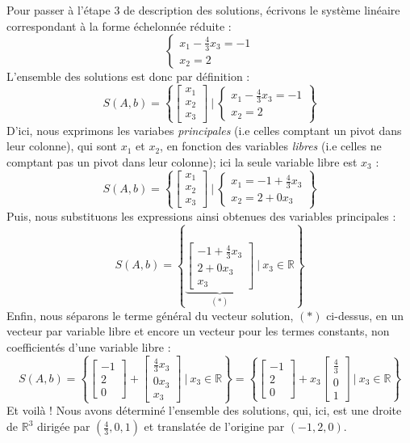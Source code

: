 \documentclass{article}
\newcommand{\R}{\mathbb{R}}
\begin{document}
Pour passer à l'étape 3 de description des solutions, écrivons le système linéaire correspondant à la forme échelonnée réduite :
$$
\begin{cases}
x_1 -\frac{4}{3}x_3 = -1\\
x_2 = 2
\end{cases}
$$
L'ensemble des solutions est donc par définition :
$$
S(A,b) = \left\{ \begin{bmatrix}
x_1 \\ x_2 \\ x_3
\end{bmatrix} \ | \ \begin{cases}
x_1 -\frac{4}{3}x_3 = -1\\
x_2 = 2
\end{cases}\right\}
$$
D'ici, nous exprimons les variabes \textit{principales} (i.e celles comptant un pivot dans leur colonne), qui sont $x_1$ et $x_2$, en fonction des variables \textit{libres} (i.e celles ne comptant pas un pivot dans leur colonne); ici la seule variable libre est $x_3$ :
$$
S(A,b) = \left\{ \begin{bmatrix}
x_1 \\ x_2 \\ x_3
\end{bmatrix} \ | \ \begin{cases}
x_1 = -1 +\frac{4}{3}x_3\\
x_2 = 2 + 0x_3
\end{cases}\right\}
$$
Puis, nous substituons les expressions ainsi obtenues des variables principales :
$$
S(A,b) = \left\{ \underbrace{\begin{bmatrix}
-1 +\frac{4}{3}x_3 \\ 2 + 0x_3 \\ x_3
\end{bmatrix}}_{(*)} \ | \ x_3 \in \R\right\}
$$
Enfin, nous séparons le terme général du vecteur solution, $(*)$ ci-dessus, en un vecteur par variable libre et encore un vecteur pour les termes constants, non coefficientés d'une variable libre :
$$
S(A,b) = \left\{ \begin{bmatrix}
-1 \\ 2 \\0
\end{bmatrix} + \begin{bmatrix}
\frac{4}{3}x_3\\ 0x_3 \\ x_3
\end{bmatrix} \ | \ x_3 \in \R\right\} = \left\{ \begin{bmatrix}
-1 \\ 2 \\0
\end{bmatrix} + x_3\begin{bmatrix}
\frac{4}{3}\\ 0 \\ 1
\end{bmatrix} \ | \ x_3 \in \R\right\}
$$
Et voilà ! Nous avons déterminé l'ensemble des solutions, qui, ici, est une droite de $\R^3$ dirigée par $(\frac{4}{3},0,1)$ et translatée de l'origine par $(-1,2,0)$. \\
\end{document}
